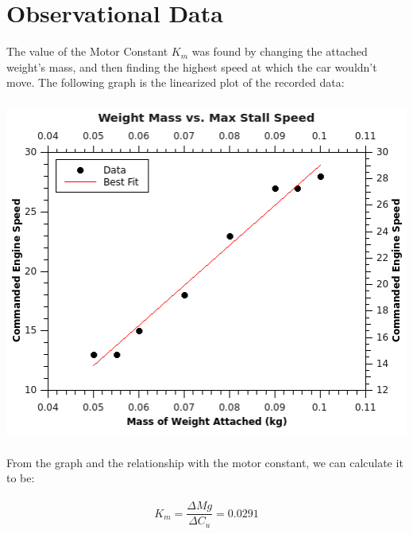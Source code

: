 \documentclass{article}
\begin{document}
\setcounter{page}{10}

\section*{Observational Data}
{
The value of the Motor Constant $K_m$ was found by changing the attached weight's mass, and then finding the highest speed at which the car wouldn't move. The following graph is the linearized plot of the recorded data:
\\
\\
\includegraphics[width=14cm]{MotorConstantGraph.png}
\\
\\
From the graph and the relationship with the motor constant, we can calculate it to be:
\\
\\
\[ K_m = \frac{\Delta M g}{\Delta C_u} = 0.0291 \]

\pagebreak

}
\end{document}
